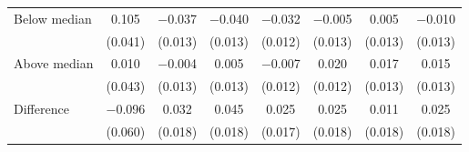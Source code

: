 \begin{tabular}[t]{lccccccc}
\hspace{1em} Below median & \num{0.105} & \num{-0.037} & \num{-0.040} & \num{-0.032} & \num{-0.005} & \num{0.005} & \num{-0.010}\\
 & (\num{0.041}) & (\num{0.013}) & (\num{0.013}) & (\num{0.012}) & (\num{0.013}) & (\num{0.013}) & (\num{0.013})\\
\hspace{1em} Above median & \num{0.010} & \num{-0.004} & \num{0.005} & \num{-0.007} & \num{0.020} & \num{0.017} & \num{0.015}\\
 & (\num{0.043}) & (\num{0.013}) & (\num{0.013}) & (\num{0.012}) & (\num{0.012}) & (\num{0.013}) & (\num{0.013})\\\cmidrule(lr){2-8}
\hspace{1em} Difference & \num{-0.096} & \num{0.032} & \num{0.045} & \num{0.025} & \num{0.025} & \num{0.011} & \num{0.025}\\
 & (\num{0.060}) & (\num{0.018}) & (\num{0.018}) & (\num{0.017}) & (\num{0.018}) & (\num{0.018}) & (\num{0.018})\\
\end{tabular}
